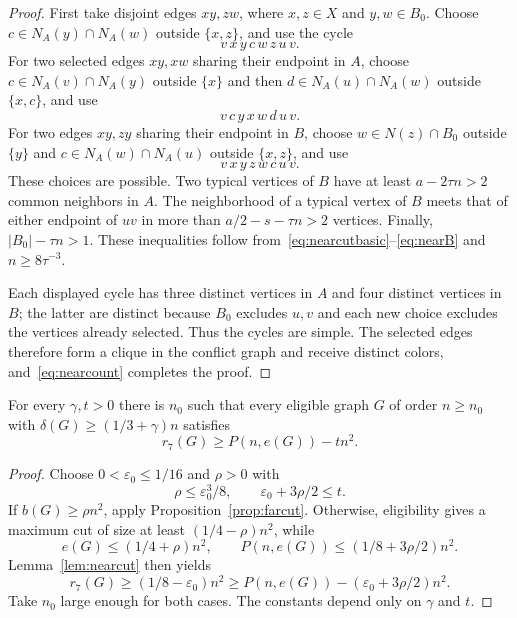 \begin{proof}
First take disjoint edges $xy,zw$, where $x,z\in X$ and $y,w\in B_0$. Choose $c\in N_A(y)\cap N_A(w)$ outside $\{x,z\}$, and use the cycle
\begin{equation}\label{eq:cycle-disjoint}
 v\,x\,y\,c\,w\,z\,u\,v.
\end{equation}
For two selected edges $xy,xw$ sharing their endpoint in $A$, choose $c\in N_A(v)\cap N_A(y)$ outside $\{x\}$ and then $d\in N_A(u)\cap N_A(w)$ outside $\{x,c\}$, and use
\begin{equation}\label{eq:cycle-shareA}
 v\,c\,y\,x\,w\,d\,u\,v.
\end{equation}
For two edges $xy,zy$ sharing their endpoint in $B$, choose $w\in N(z)\cap B_0$ outside $\{y\}$ and $c\in N_A(w)\cap N_A(u)$ outside $\{x,z\}$, and use
\begin{equation}\label{eq:cycle-shareB}
 v\,x\,y\,z\,w\,c\,u\,v.
\end{equation}
These choices are possible. Two typical vertices of $B$ have at least $a-2\tau n>2$ common neighbors in $A$. The neighborhood of a typical vertex of $B$ meets that of either endpoint of $uv$ in more than $a/2-s-\tau n>2$ vertices. Finally, $|B_0|-\tau n>1$. These inequalities follow from~\eqref{eq:nearcutbasic}--\eqref{eq:nearB} and $n\ge8\tau^{-3}$.

Each displayed cycle has three distinct vertices in $A$ and four distinct vertices in $B$; the latter are distinct because $B_0$ excludes $u,v$ and each new choice excludes the vertices already selected. Thus the cycles are simple. The selected edges therefore form a clique in the conflict graph and receive distinct colors, and~\eqref{eq:nearcount} completes the proof.
\end{proof}

\begin{proposition}\label{prop:terminal}
For every $\gamma,t>0$ there is $n_0$ such that every eligible graph $G$ of order $n\ge n_0$ with $\delta(G)\ge(1/3+\gamma)n$ satisfies
\begin{equation}\label{eq:terminal}
 r_7(G)\ge P(n,e(G))-tn^2.
\end{equation}
\end{proposition}
\begin{proof}
Choose $0<\varepsilon_0\le1/16$ and $\rho>0$ with
\[
 \rho\le\varepsilon_0^3/8,\qquad
 \varepsilon_0+3\rho/2\le t.
\]
If $b(G)\ge\rho n^2$, apply Proposition~\ref{prop:farcut}. Otherwise, eligibility gives a maximum cut of size at least $(1/4-\rho)n^2$, while
\[
 e(G)\le(1/4+\rho)n^2,\qquad
 P(n,e(G))\le(1/8+3\rho/2)n^2.
\]
Lemma~\ref{lem:nearcut} then yields
\[
 r_7(G)\ge(1/8-\varepsilon_0)n^2
 \ge P(n,e(G))-(\varepsilon_0+3\rho/2)n^2.
\]
Take $n_0$ large enough for both cases. The constants depend only on $\gamma$ and $t$.
\end{proof}
